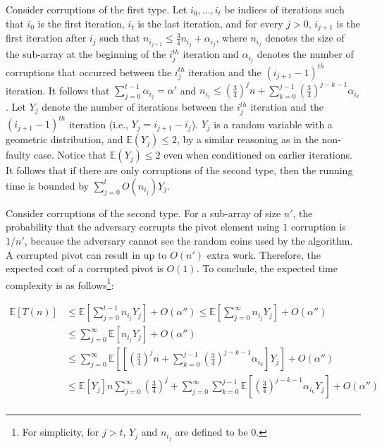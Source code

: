 \documentclass{llncs}
\begin{document}
\begin{pf}
Consider corruptions of the first type. Let $i_0,\ldots,i_t$ be indices of iterations such that $i_0$ is the first iteration, $i_t$ is the last iteration, and for every $j > 0$, $i_{j+1}$ is the first iteration after $i_j$ such that $n_{i_{j+1}} \leq \frac{3}{4}n_{i_{j}} + \alpha_{i_j}$, where $n_{i_j}$ denotes the size of the sub-array at the beginning of the $i_j^{th}$ iteration and $\alpha_{i_j}$ denotes the number of corruptions that occurred between the $i_j^{th}$ iteration and the $(i_{j+1} - 1)^{th}$ iteration. It follows that $\sum_{j = 0}^{t - 1} \alpha_{i_j} = \alpha'$ and $n_{i_j} \leq \left( \frac{3}{4} \right)^j n + \sum_{k=0}^{j-1} \left( \frac{3}{4} \right)^{j-k-1} \alpha_{i_k}$. Let $Y_j$ denote the number of iterations between the $i_j^{th}$ iteration and the $(i_{j+1} - 1)^{th}$ iteration (i.e., $Y_j = i_{j+1} - i_j$). $Y_j$ is a random variable with a geometric distribution, and $\mathbb{E}(Y_j) \leq 2$, by a similar reasoning as in the non-faulty case. Notice that $\mathbb{E}(Y_j) \leq 2$ even when conditioned on earlier iterations. It follows that if there are only corruptions of the second type, then the running time is bounded by $\sum_{j=0}^{t} O(n_{i_j}) Y_j$.

Consider corruptions of the second type. For a sub-array of size $n'$, the probability that the adversary corrupts the pivot element using $1$ corruption is $1/n'$, because the adversary cannot see the random coins used by the algorithm. A corrupted pivot can result in up to $O(n')$ extra work. Therefore, the expected cost of a corrupted pivot is $O(1)$. To conclude, the expected time complexity is as follows\footnote{For simplicity, for $j > t$, $Y_j$ and $n_{i_j}$ are defined to be $0$.}:

\begin{align*}
\mathbb{E}\left[T(n)\right] &\leq \mathbb{E} \left[\sum_{j=0}^{t-1} n_{i_j} Y_j \right] + O(\alpha'') \leq \mathbb{E} \left[\sum_{j=0}^{\infty} n_{i_j} Y_j \right] + O(\alpha'')\\
&\leq \sum_{j=0}^{\infty} \mathbb{E} \left[n_{i_j} Y_j \right] + O(\alpha'')\\
&\leq \sum_{j=0}^{\infty} \mathbb{E} \left[ \left[ \left( \frac{3}{4} \right)^j n + \sum_{k=0}^{j-1} \left( \frac{3}{4} \right)^{j-k-1} \alpha_{i_k} \right] Y_j \right] + O(\alpha'')\\
&\leq \mathbb{E} \left[ Y_j \right] n \sum_{j=0}^{\infty} \left( \frac{3}{4} \right)^j + \sum_{j=0}^{\infty} \sum_{k=0}^{j-1} \mathbb{E} \left[ \left( \frac{3}{4} \right)^{j-k-1}    \alpha_{i_k} Y_j \right] + O(\alpha'')\\
\end{align*}


\end{pf}
\end{document}
